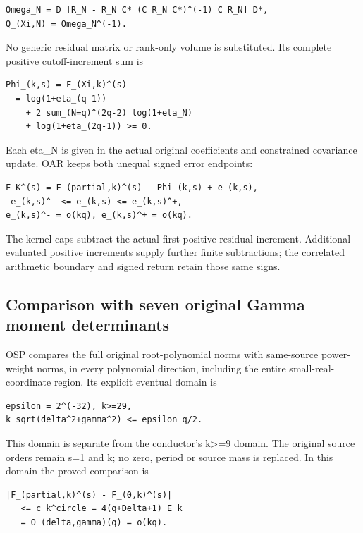 \documentclass[
]{article}
\begin{document}
\begin{verbatim}
Omega_N = D [R_N - R_N C* (C R_N C*)^(-1) C R_N] D*,
Q_(Xi,N) = Omega_N^(-1).
\end{verbatim}

No generic residual matrix or rank-only volume is substituted. Its
complete positive cutoff-increment sum is

\begin{verbatim}
Phi_(k,s) = F_(Xi,k)^(s)
  = log(1+eta_(q-1))
    + 2 sum_(N=q)^(2q-2) log(1+eta_N)
    + log(1+eta_(2q-1)) >= 0.
\end{verbatim}

Each eta\_N is given in the actual original coefficients and constrained
covariance update. OAR keeps both unequal signed error endpoints:

\begin{verbatim}
F_K^(s) = F_(partial,k)^(s) - Phi_(k,s) + e_(k,s),
-e_(k,s)^- <= e_(k,s) <= e_(k,s)^+,
e_(k,s)^- = o(kq), e_(k,s)^+ = o(kq).
\end{verbatim}

The kernel caps subtract the actual first positive residual increment.
Additional evaluated positive increments supply further finite
subtractions; the correlated arithmetic boundary and signed return
retain those same signs.

\subsection{Comparison with seven original Gamma moment
determinants}\label{comparison-with-seven-original-gamma-moment-determinants}

OSP compares the full original root-polynomial norms with same-source
power-weight norms, in every polynomial direction, including the entire
small-real-coordinate region. Its explicit eventual domain is

\begin{verbatim}
epsilon = 2^(-32), k>=29,
k sqrt(delta^2+gamma^2) <= epsilon q/2.
\end{verbatim}

This domain is separate from the conductor's k\textgreater=9 domain. The
original source orders remain s=1 and k; no zero, period or source mass
is replaced. In this domain the proved comparison is

\begin{verbatim}
|F_(partial,k)^(s) - F_(0,k)^(s)|
   <= c_k^circle = 4(q+Delta+1) E_k
   = O_(delta,gamma)(q) = o(kq).
\end{verbatim}
\end{document}
